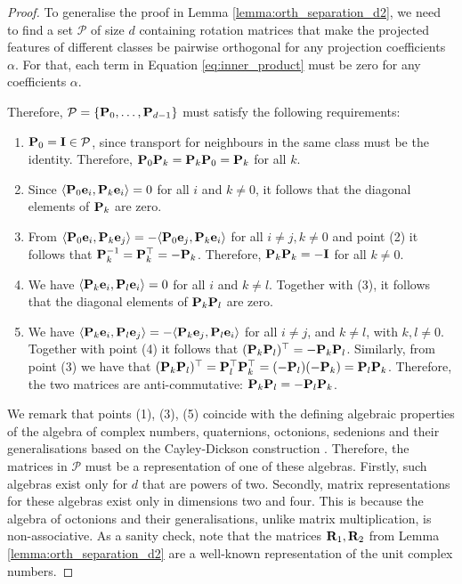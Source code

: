 \documentclass{article}
\def\ve{{\bf{e}}}
\def\mI{{\bf{I}}}
\def\mP{{\bf{P}}}
\def\mR{{\bf{R}}}
\def\gP{{\mathcal{P}}}
\begin{document}
\OrthSeparation*
\begin{proof}
To generalise the proof in Lemma \ref{lemma:orth_separation_d2}, we need to find a set $\gP$ of size $d$ containing rotation matrices that make the projected features of different classes be pairwise orthogonal for any projection coefficients $\alpha$. For that, each term in Equation \ref{eq:inner_product} must be zero for any coefficients $\alpha$. 

Therefore, $\gP = \{\mP_0,\ldots,\mP_{d-1}\}$ must satisfy the following requirements:
\begin{enumerate}
    \item $\mP_0 = \mI \in \gP$, since transport for neighbours in the same class must be the identity. Therefore, $\mP_0 \mP_k = \mP_k \mP_0 = \mP_k$ for all $k$.  
    \item Since $\langle \mP_0 \ve_i , \mP_k \ve_i \rangle = 0$ for all $i$ and $k \neq 0$, it follows that the diagonal elements of $\mP_k$ are zero. 
    \item From $\langle \mP_0 \ve_i , \mP_k \ve_j \rangle = -\langle \mP_0 \ve_j, \mP_k \ve_i \rangle$ for all $i \neq j, k \neq 0$ and point (2) it follows that $\mP_k^{-1} = \mP_k^\top = -\mP_k$. Therefore, $\mP_k\mP_k = -\mI$ for all $k \neq 0$. 
    \item We have $\langle \mP_k \ve_i , \mP_l \ve_i \rangle = 0$ for all $i$ and $k \neq l$. Together with (3), it follows that the diagonal elements of $\mP_k\mP_l$ are zero. 
    \item We have $\langle \mP_k \ve_i, \mP_l \ve_j \rangle = -\langle \mP_k \ve_j, \mP_l \ve_i \rangle$ for all $i \neq j$, and $k \neq l$, with $k,l \neq 0$. Together with point (4) it follows that $(\mP_k \mP_l)^\top = -\mP_k\mP_l$. Similarly, from point (3) we have that $(\mP_k \mP_l)^\top = \mP_l^\top \mP_k^\top = (-\mP_l)(-\mP_k) = \mP_l \mP_k$. Therefore, the two matrices are anti-commutative: $\mP_k \mP_l = -\mP_l \mP_k$.
\end{enumerate}

We remark that points (1), (3), (5) coincide with the defining algebraic properties of the algebra of complex numbers, quaternions, octonions, sedenions and their generalisations based on the Cayley-Dickson construction \citep{schafer2017introduction}. Therefore, the matrices in $\gP$ must be a representation of one of these algebras. Firstly, such algebras exist only for $d$ that are powers of two. Secondly, matrix representations for these algebras exist only in dimensions two and four. This is because the algebra of octonions and their generalisations, unlike matrix multiplication, is non-associative. As a sanity check, note that the matrices $\mR_1, \mR_2$ from Lemma \ref{lemma:orth_separation_d2} are a well-known representation of the unit complex numbers.  


\end{proof}
\end{document}

